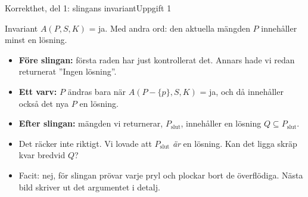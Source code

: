 \documentclass[aspectratio=169,10pt]{beamer}
\begin{document}
\begin{frame}{Korrekthet, del 1: slingans invariant}{Uppgift 1}
  \begin{block}{Invariant}
    $A(P,S,K)$ = ja. Med andra ord: den aktuella mängden $P$ innehåller minst en lösning.
  \end{block}
  \begin{itemize}
    \item<2-> \textbf{Före slingan:} första raden har just kontrollerat det. Annars hade vi redan returnerat ''Ingen lösning''.
    \item<3-> \textbf{Ett varv:} $P$ ändras bara när $A(P-\{p\},S,K)$ = ja, och då innehåller också det nya $P$ en lösning.
    \item<4-> \textbf{Efter slingan:} mängden vi returnerar, $P_{\text{slut}}$, innehåller en lösning $Q\subseteq P_{\text{slut}}$.
    \item<5-> Det räcker inte riktigt. Vi lovade att $P_{\text{slut}}$ \emph{är} en lösning. Kan det ligga skräp kvar bredvid $Q$?
    \item<6-> Facit: nej, för slingan prövar varje pryl och plockar bort de överflödiga. Nästa bild skriver ut det argumentet i detalj.
  \end{itemize}
\end{frame}
\end{document}
